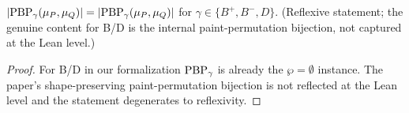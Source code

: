 \begin{proposition}
  \label{prop:10_2_BD}
  \leanok
  $|\mathrm{PBP}_\gamma(\mu_P, \mu_Q)| = |\mathrm{PBP}_\gamma(\mu_P, \mu_Q)|$ for $\gamma \in \{B^+, B^-, D\}$.
  (Reflexive statement; the genuine content for B/D is the internal paint-permutation bijection, not captured at the Lean level.)
\end{proposition}
\begin{proof}
  \leanok
  For B/D in our formalization $\mathrm{PBP}_\gamma$ is already the $\wp = \emptyset$ instance. The paper's shape-preserving paint-permutation bijection is not reflected at the Lean level and the statement degenerates to reflexivity.
\end{proof}

